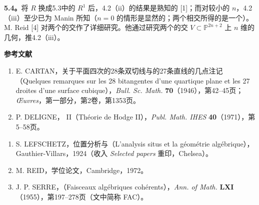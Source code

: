 \textbf{5.4。}将 $R$ 换成5.3中的 $R^1$ 后，4.2（ii）的结果是熟知的 [1]；而对较小的 $n$，4.2（iii）至少已为 Manin 所知（$n=0$ 的情形是显然的；两个相交所得的是一个）。M. Reid [4] 对两个的交作了详细研究。他通过研究两个的交 $V\subset\mathbb P^{2n+2}$ 上 $n$ 维的几何，推4.2（iii）。

\textbf{参考文献}
\begin{enumerate}
\item[{[1]}] E. CARTAN，关于平面四次的28条双切线与的27条直线的几点注记（Quelques remarques sur les 28 bitangentes d'une quartique plane et les 27 droites d'une surface cubique），\textit{Bull. Sc. Math.} \textbf{70}（1946），第42--45页；\textit{Œuvres}，第一部分，第2卷，第1353页。
\item[{[2]}] P. DELIGNE， II（Théorie de Hodge II），\textit{Publ. Math. IHES} \textbf{40}（1971），第5--58页。
\end{enumerate}

\begin{enumerate}
\item[{[3]}] S. LEFSCHETZ，位置分析与（L'analysis situs et la géométrie algébrique），Gauthier-Villars，1924（收入 \textit{Selected papers} 重印，Chelsea）。
\item[{[4]}] M. REID，学位论文，Cambridge，1972。
\item[{[5]}] J. P. SERRE，（Faisceaux algébriques cohérents），\textit{Ann. of Math.} \textbf{LXI}（1955），第197--278页（文中简称 FAC）。
\end{enumerate}
